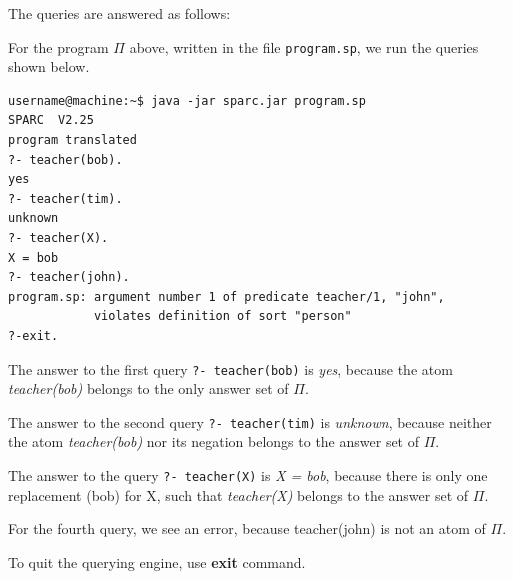 \documentclass[12pt, letterpaper]{article}
\begin{document}
The queries are answered as follows:
 
For the program $\Pi$ above, written in the file \texttt{program.sp}, we run the queries shown below. 

\begin{verbatim}
username@machine:~$ java -jar sparc.jar program.sp
SPARC  V2.25
program translated
?- teacher(bob).
yes
?- teacher(tim).
unknown
?- teacher(X).
X = bob
?- teacher(john).
program.sp: argument number 1 of predicate teacher/1, "john", 
            violates definition of sort "person"
?-exit.
\end{verbatim}

The answer to the first query \texttt{?- teacher(bob)} is \textit{yes}, because the atom \textit{teacher(bob)} belongs to the only answer set of $\Pi$.

The answer to the second query \texttt{?- teacher(tim)} is \textit{unknown}, because neither the atom \textit{teacher(bob)} nor its negation belongs to the answer set of $\Pi$.

The answer to the query \texttt{?- teacher(X)} is \textit{X = bob}, because there is only one replacement (bob) for X, such that \textit{teacher(X)} belongs to the answer set of $\Pi$.

For the fourth query, we see an error, because teacher(john) is not an atom of $\Pi$.

To quit the querying engine, use \textbf{exit} command.
\end{document}
